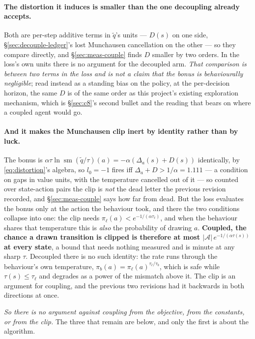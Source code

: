 \documentclass{article}
\newcommand{\actions}{\mathcal{A}}
\DeclareMathOperator{\sm}{sm}
\newcommand{\gap}{\Delta}
\begin{document}
\paragraph{The distortion it induces is smaller than the one decoupling already accepts.}
Both are per-step additive terms in $\tilde{q}$'s units --- $D(s)$ on one side,
\S\ref{sec:decouple-ledger}'s lost Munchausen cancellation on the other --- so they compare
directly, and \S\ref{sec:meas-couple} finds $D$ smaller by two orders. In the loss's own units
there is no argument for the decoupled arm. \emph{That comparison is between two terms in the
loss and is not a claim that the bonus is behaviourally negligible}; read instead as a standing
bias on the policy, at the per-decision horizon, the same $D$ is of the same order as this
project's existing exploration mechanism, which is \S\ref{sec:c8}'s second bullet and the reading
that bears on where a coupled agent would go.

\paragraph{And it makes the Munchausen clip inert by identity rather than by luck.} The bonus is
$\alpha\tau\ln\sm(\tilde{q}/\tau)(a) = -\alpha(\gap_a(s) + D(s))$ identically, by
\eqref{eq:distortion}'s algebra, so $l_0 = -1$ fires iff $\gap_a + D > 1/\alpha = 1.111$ --- a
condition on gaps in value units, with the temperature cancelled out of it --- so counted over
state-action pairs the clip is \emph{not} the dead letter the previous revision recorded, and
\S\ref{sec:meas-couple} says how far from dead. But the loss evaluates the bonus only at the
action the behaviour took, and there the two conditions collapse into one: the clip needs
$\pi_\ell(a) < e^{-1/(\alpha\tau_\ell)}$, and when the behaviour shares that temperature this is
\emph{also} the probability of drawing $a$. \textbf{Coupled, the chance a drawn transition is
clipped is therefore at most $|\actions|\,e^{-1/(\alpha\tau(s))}$ at every state}, a bound that
needs nothing measured and is minute at any sharp $\tau$. Decoupled there is no such identity:
the rate runs through the behaviour's own temperature,
$\pi_b(a) = \pi_\ell(a)^{\tau_\ell/\tau_b}$, which is safe while $\tau(s) \le \tau_\ell$ and
degrades as a power of the mismatch above it. The clip is an argument for coupling, and the
previous two revisions had it backwards in both directions at once.

\emph{So there is no argument against coupling from the objective, from the constants, or from
the clip.} The three that remain are below, and only the first is about the algorithm.
\end{document}
